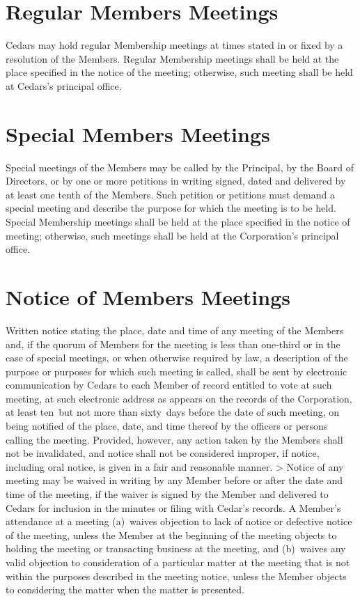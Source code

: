 \documentclass[
]{book}
\begin{document}
\section{Regular Members Meetings}\label{regular-members-meetings}

Cedars may hold regular Membership meetings at times stated in or
fixed by a resolution of the Members. Regular Membership meetings
shall be held at the place specified in the notice of the meeting;
otherwise, such meeting shall be held at Cedars's principal office.

\section{Special Members Meetings}\label{special-members-meetings}

Special meetings of the Members may be called by the Principal, by the
Board of Directors, or by one or more petitions in writing signed,
dated and delivered by at least one tenth of the Members. Such
petition or petitions must demand a special meeting and describe the
purpose for which the meeting is to be held. Special Membership
meetings shall be held at the place specified in the notice of
meeting; otherwise, such meetings shall be held at the Corporation's
principal office.

\section{Notice of Members Meetings}\label{notice-of-members-meetings}

Written notice stating the place, date and time of any meeting of the
Members and, if the quorum of Members for the meeting is less than
one‑third or in the case of special meetings, or when otherwise
required by law, a description of the purpose or purposes for which
such meeting is called, shall be sent by electronic communication by
Cedars to each Member of record entitled to vote at such meeting, at
such electronic address as appears on the records of the Corporation,
at least ten~but not more than sixty~days before the date of such
meeting, on being notified of the place, date, and time thereof by the
officers or persons calling the meeting. Provided, however, any action
taken by the Members shall not be invalidated, and notice shall not be
considered improper, if notice, including oral notice, is given in a
fair and reasonable manner.
\textgreater{}
Notice of any meeting may be waived in writing by any Member before or
after the date and time of the meeting, if the waiver is signed by the
Member and delivered to Cedars for inclusion in the minutes or filing
with Cedar's records. A Member's attendance at a meeting (a)~waives
objection to lack of notice or defective notice of the meeting, unless
the Member at the beginning of the meeting objects to holding the
meeting or transacting business at the meeting, and (b)~waives any
valid objection to consideration of a particular matter at the meeting
that is not within the purposes described in the meeting notice,
unless the Member objects to considering the matter when the matter is
presented.
\end{document}

